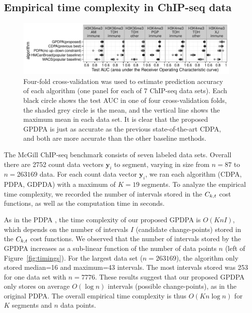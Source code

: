 \documentclass{article}
\begin{document}
\subsection{Empirical time complexity in ChIP-seq data}
\label{sec:results_time}

\begin{figure}[b!]
  \centering
  \includegraphics[width=\textwidth]{figure-test-error-dots}
  \vskip -0.5cm
  \caption{Four-fold cross-validation was used to estimate prediction
    accuracy of each algorithm (one panel for each of 7 ChIP-seq data sets). 
Each black circle shows the test AUC in one of four
    cross-validation folds, the shaded grey circle is the mean, and
    the vertical line shows the maximum mean in each data set. It is
    clear that the proposed GPDPA is
    just as accurate as the previous state-of-the-art CDPA, and both are
    more accurate than the other baseline methods. 
  }
  \label{fig:test-error-dots}
\end{figure}

The McGill ChIP-seq benchmark consists of seven labeled data
sets. Overall there are 2752 count data vectors $\mathbf y_i$ to
segment, varying in size from $n=87$ to $n=263169$ data. For each
count data vector $\mathbf y_i$, we ran each algorithm (CDPA, PDPA,
GDPDA) with a maximum of $K=19$ segments. To analyze the empirical
time complexity, we recorded the number of intervals stored in the
$C_{k,t}$ cost functions, as well as the computation time in
seconds.

As in the PDPA \citep{pruned-dp-new}, the time complexity of our
proposed GPDPA is $O(K n I)$, which depends on the number of intervals
$I$ (candidate change-points) stored in the $C_{k,t}$ cost
functions. We observed that the number of intervals stored by the
GPDPA increases as a sub-linear function of the number of data points
$n$ (left of Figure~\ref{fig:timings}). For the largest data set
($n=263169$), the algorithm only stored median=16 and maximum=43
intervals. The most intervals stored was 253 for one data set with
$n=7776$. These results suggest that our proposed GPDPA only stores on
average $O(\log n)$ intervals (possible change-points), as in the
original PDPA. The overall empirical time complexity is thus
$O(K n \log n)$ for $K$ segments and $n$ data points.
\end{document}
